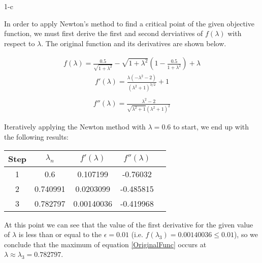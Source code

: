 \documentclass[11pt]{article}
\begin{document}
\begin{prob}{1-c}
\end{prob}
\begin{sol} 

In order to apply Newton's method to find a critical point of the given objective function, we must first derive the first and second derviatives of $f(\lambda)$ with respect to $\lambda$. The original function and its derivatives are shown below.

\begin{eqnarray*}
f(\lambda)=\frac{0.5}{\sqrt{1+\lambda^2}}-\sqrt{1+\lambda^2} \left(1-\frac{0.5}{1+\lambda^2}\right)+\lambda
\end{eqnarray*}
\begin{eqnarray*}
f'(\lambda)=\frac{\lambda \left(-\lambda^2-2\right)}{\left(\lambda^2+1\right)^{3/2}}+1 \\
\end{eqnarray*}
\begin{eqnarray*}
f''(\lambda)=\frac{\lambda^2-2}{\sqrt{\lambda^2+1} \left(\lambda^2+1\right)^2}
\end{eqnarray*}

Iteratively applying the Newton method with $\lambda = 0.6$ to start, we end up with the following results:

\begin{center}
  \begin{tabular}{| c | c | c | c | c |}
    \hline
	Step & $\lambda_{n}$ & $f'(\lambda)$ & $f''(\lambda)$ \\ \hline
	1 & 0.6 & 0.107199 & -0.76032 \\ \hline
	2 & 0.740991 & 0.0203099 & -0.485815 \\ \hline
	3 & 0.782797 & 0.00140036 & -0.419968 \\ \hline	
  \end{tabular}
\end{center}

At this point we can see that the value of the first derivative for the given value of $\lambda$ is less than or equal to the $\epsilon = 0.01$ (i.e. $f(\lambda_3) = 0.00140036 \leq 0.01$), so we conclude that the maximum of equation \ref{OriginalFunc} occurs at $\lambda \approx \lambda_{3} = 0.782797$.

\end{sol}
\end{document}
